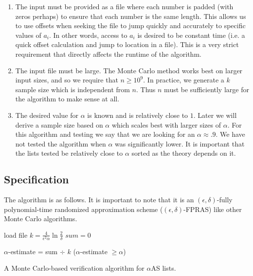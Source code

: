 \documentclass[11pt]{article}
\begin{document}
\begin{enumerate}

\item The input must be provided as a file where each number is padded (with zeros perhaps) to ensure that each number is the same length. This allows us to use offsets when seeking the file to jump quickly and accurately to specific values of $a_i$. In other words, access to $a_i$ is desired to be constant time (i.e. a quick offset calculation and jump to location in a file). This is a very strict requirement that directly affects the runtime of the algorithm. 

\item The input file must be large. The Monte Carlo method works best on larger input sizes, and so we require that $n \geq 10^9$. In practice, we generate a $k$ sample size which is independent from $n$. Thus $n$ must be sufficiently large for the algorithm to make sense at all.

\item The desired value for $\alpha$ is known and is relatively close to $1$. Later we will derive a sample size based on $\alpha$ which scales best with larger sizes of $\alpha$. For this algorithm and testing we say that we are looking for an $\alpha \approx .9$. We have not tested the algorithm when $\alpha$ was significantly lower. It is important that the lists tested be relatively close to $\alpha$ sorted as the theory depends on it. 

\end{enumerate}

\subsection{Specification}

The algorithm is as follows. It is important to note that it is an $(\epsilon, \delta)$-fully polynomial-time randomized approximation scheme ($(\epsilon, \delta)$-FPRAS) like other Monte Carlo algorithms. 

\vspace{.15in}

\begin{algorithm}[H]
 
 	load file\;
 	$k = \frac{4}{\epsilon^2 \alpha} \ln \frac{2}{\delta}$\;
	$sum = 0$\; 
 
 	
 	$\alpha$-estimate = sum $\div$ $k$\;
 	\Return ($\alpha$-estimate $\geq \alpha$)\;
 	\vspace{.15in}
 	\caption{A Monte Carlo-based verification algorithm for $\alpha$AS lists.}
\end{algorithm}
\end{document}
